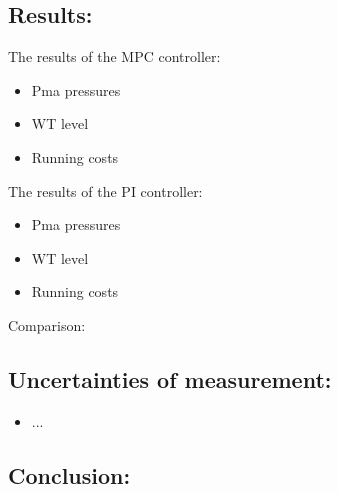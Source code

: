 \subsection*{Results:}
The results of the MPC controller:
\begin{itemize}
	\item Pma pressures
	\item WT level
	\item Running costs
\end{itemize}	

The results of the PI controller:
\begin{itemize}
	\item Pma pressures
	\item WT level
	\item Running costs
\end{itemize}	

Comparison:

\subsection*{Uncertainties of measurement:}
\begin{itemize}
\item ...
\end{itemize}

\subsection*{Conclusion:}

